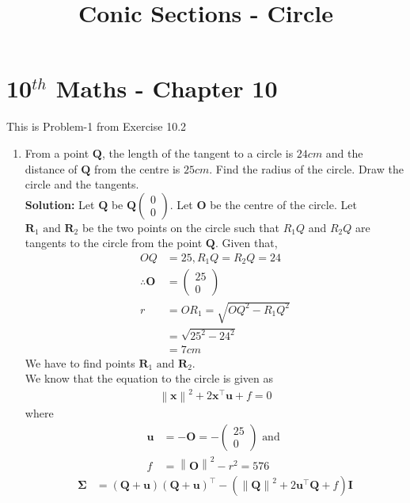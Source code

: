 \documentclass[12pt]{article}
\providecommand{\brak}[1]{\ensuremath{\left(#1\right)}}
\providecommand{\norm}[1]{\left\lVert#1\right\rVert}
\newcommand{\solution}{\noindent \textbf{Solution: }}
\newcommand{\myvec}[1]{\ensuremath{\begin{pmatrix}#1\end{pmatrix}}}
\let\vec\mathbf
\begin{document}
\begin{center}
\title{\textbf{Conic Sections - Circle}}
\date{\vspace{-5ex}} %
\maketitle
\end{center}
\setcounter{page}{1}

\section{10$^{th}$ Maths - Chapter 10}
This is Problem-1 from Exercise 10.2
\begin{enumerate}
\item From a point $\vec{Q}$, the length of the tangent to a circle is $24 cm$ and the distance of $\vec{Q}$ from the centre is $25 cm$. Find the radius of the circle. Draw the circle and the tangents. \\ 
\solution 
Let $\vec{Q}$ be $\vec{Q}\myvec{0 \\ 0}$. Let $\vec{O}$ be the centre of the circle. Let $\vec{R}_1 \text{ and } \vec{R}_2$ be the two points on the circle such that $R_1Q$ and $R_2Q$ are tangents to the circle from the point $\vec{Q}$. Given that,  
\begin{align}
	OQ &= 25, R_1Q = R_2Q = 24 \\ 
	\therefore \vec{O} &= \myvec{25 \\ 0} \\
	r &= OR_1 = \sqrt{OQ^2 - R_1Q^2}  \\
	&= \sqrt{25^2 - 24^2} \\
	&= 7cm
\end{align}
We have to find points $\vec{R}_1 \text{ and } \vec{R}_2$. \\
We know that the equation to the circle is given as
\begin{align}
	\label{eq:circEq1}
	\norm{\vec{x}}^2+2\vec{x}^\top\vec{u}+f = 0 
\end{align}
where
\begin{align}
	\vec{u} &= -\vec{O}  = -\myvec{25\\0}\text{ and } \\
        \label{eq:fRelation}
	f &= \norm{\vec{O}}^2 - r^2 = 576
\end{align}
\begin{align}
	\vec{\Sigma} &= \brak{\vec{Q}+\vec{u}}\brak{\vec{Q}+\vec{u}}^\top - \brak{\norm{\vec{Q}}^2+2\vec{u}^\top\vec{Q}+f}\vec{I}

\end{align}
\end{enumerate}
\end{document}
